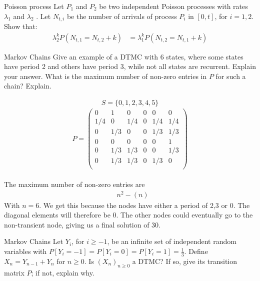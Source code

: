 \begin{problem}{Poisson process}
Let $P_1$ and $P_2$ be two independent Poisson processes with rates 
$\lambda_1$ and $\lambda_2$ . Let $N_{t,i}$ be the number of arrivals of process $P_i$ in $[0, t]$, for $i = 1, 2$. Show that:
\begin{align*}
    \lambda_2^k P(N_{t,1} = N_{t,2} + k) 
    &=\lambda_1^k P(N _{t,2} = N_{t,1} + k)
\end{align*}
\end{problem}

\begin{problem}{Markov Chains}
Give an example of a DTMC with 6 states, where some states have period 2 and others have period 3, while not all states are recurrent. Explain your answer. What is the maximum number of non-zero entries in \( P \) for such a chain? Explain.
\end{problem}
\begin{solution}
    \begin{align*}
        S=\{0,1,2,3,4,5\}
    \end{align*}
    \[
        P = \begin{pmatrix}
                0 & 1 & 0 & 0 & 0 & 0 \\
                1/4 & 0 & 1/4 & 0 & 1/4 & 1/4\\
                0 & 1/3 & 0 & 0 & 1/3 & 1/3 \\
                0 & 0 & 0 & 0 & 0 & 1\\
                0 & 1/3 & 1/3 & 0 & 0 & 1/3\\
                0 & 1/3& 1/3& 0 & 1/3& 0\\
        \end{pmatrix}
    \]
    \\
    The maximum number of non-zero entries are
    \begin{align*}
        & n^2 - (n)
    \end{align*}
    With $n=6$. We get this because the nodes have either a period of 2,3 or 0. The diagonal elements will therefore be 0. The other nodes could eventually go to the non-transient node, giving us a final solution of 30.
\end{solution}

\begin{problem}{Markov Chains}
Let \( Y_i \), for \( i \geq -1 \), be an infinite set of independent random variables with \( P [Y_i = -1] = P [Y_i = 0] = P [Y_i = 1] = \frac{1}{3} \). Define \( X_n = Y_{n-1} + Y_n \) for \( n \geq 0 \). Is \( (X_n)_{n \geq 0} \) a DTMC? If so, give its transition matrix \( P \); if not, explain why.
\end{problem}

